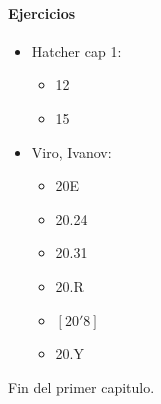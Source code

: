 \paragraph{\textbf{Ejercicios}}

\begin{itemize}
  \item Hatcher cap 1:
  \begin{itemize}
    \item 12
    \item 15
  \end{itemize}
  \item Viro, Ivanov:
  \begin{itemize}
    \item 20E
    \item 20.24
    \item 20.31
    \item 20.R
    \item $[20'8]$
    \item 20.Y
  \end{itemize}
\end{itemize}

Fin del primer capitulo.

